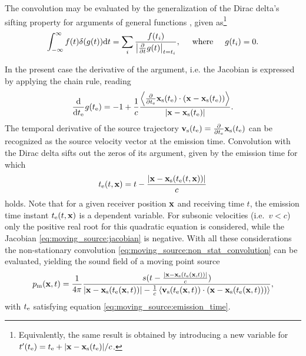 The convolution may be evaluated by the generalization of the Dirac delta's sifting property for arguments of general functions \cite{Dowling1983, Crighton1992, Jackson1999}, given as\footnote{
Equivalently, the same result is obtained by introducing a new variable for $t'(t_{\mathrm{e}}) = t_{\mathrm{e}} + |\mathbf{x}-\mathbf{x}_{\mathrm{s}}(t_{\mathrm{e}})|/c$.}
\begin{equation}
\int_{-\infty}^{\infty} f(t) \delta(g(t)) \mathrm{d} t = \sum_{i} \frac{f(t_i)}{\left| \frac{\partial}{\partial t} g(t) \right|_{t = t_i}}, \hspace{5mm} \text{where} \hspace{5mm} g(t_i) = 0.
\end{equation}

In the present case the derivative of the argument, i.e. the Jacobian is expressed by applying the chain rule, reading 
\begin{equation}
\label{eq:moving_source:jacobian}
\frac{\mathrm{d} }{\mathrm{d} t_{\mathrm{e}}} g(t_{\mathrm{e}}) = - 1 + \frac{1}{c} \frac{\left< \frac{\partial}{\partial t_{\mathrm{e}}} \mathbf{x}_{\mathrm{s}}(t_{\mathrm{e}}) \cdot (\mathbf{x}-\mathbf{x}_{\mathrm{s}}(t_{\mathrm{e}}))\right> }{|\mathbf{x}-\mathbf{x}_{\mathrm{s}}(t_{\mathrm{e}})|}.
\end{equation}
The temporal derivative of the source trajectory $\mathbf{v}_{\mathrm{s}}(t_{\mathrm{e}}) = \frac{\partial}{\partial t_{\mathrm{e}}}\mathbf{x}_{\mathrm{s}}(t_{\mathrm{e}})$ can be recognized as the source velocity vector at the emission time.
Convolution with the Dirac delta sifts out the zeros of its argument, given by the emission time for which
\begin{equation}
\label{eq:moving_source:emission_time}
t_{\mathrm{e}}(t,\mathbf{x}) = t - \frac{|\mathbf{x}-\mathbf{x}_{\mathrm{s}}(t_{\mathrm{e}}(t,\mathbf{x}))|}{c}
\end{equation}
holds.
Note that for a given receiver position $\mathbf{x}$ and receiving time $t$, the emission time instant $t_{\mathrm{e}}(t,\mathbf{x})$ is a dependent variable.
For subsonic velocities (i.e.\ $v<c$) only the positive real root for this quadratic equation is considered, while the Jacobian \eqref{eq:moving_source:jacobian} is negative.
With all these considerations the non-stationary convolution \eqref{eq:moving_source:non_stat_convolution} can be evaluated, yielding the sound field of a moving point source
\begin{equation}
p_{\mathrm{m}}(\mathbf{x},t) =
\frac{1}{4\pi} \frac{ s(t - \frac{|\mathbf{x}-\mathbf{x}_{\mathrm{s}}(t_{\mathrm{e}}(\mathbf{x},t))|}{c} ) }{|\mathbf{x}-\mathbf{x}_{\mathrm{s}}(t_{\mathrm{e}}(\mathbf{x},t))| - \frac{1}{c}\left< \mathbf{v}_{\mathrm{s}}(t_{\mathrm{e}}(\mathbf{x},t)) \cdot (\mathbf{x}-\mathbf{x}_{\mathrm{s}}(t_{\mathrm{e}}(\mathbf{x},t)))\right> },
\end{equation}
with $t_{\mathrm{e}}$ satisfying equation \eqref{eq:moving_source:emission_time}.

